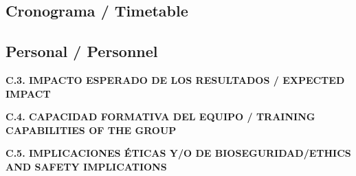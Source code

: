 \documentclass[a4paper,11pt,oneside]{article}
\begin{document}




\subsection*{Cronograma / Timetable}



\subsection*{Personal / Personnel}



\vspace{12pt}

\noindent\textbf{C.3. IMPACTO ESPERADO DE LOS RESULTADOS / EXPECTED IMPACT}



\vspace{12pt}

\noindent\textbf{C.4. CAPACIDAD FORMATIVA DEL EQUIPO / TRAINING CAPABILITIES OF THE GROUP}


%
%
%
%


\vspace{12pt}

\noindent\textbf{C.5. IMPLICACIONES ÉTICAS Y/O DE BIOSEGURIDAD/ETHICS AND SAFETY IMPLICATIONS}


\end{document}
